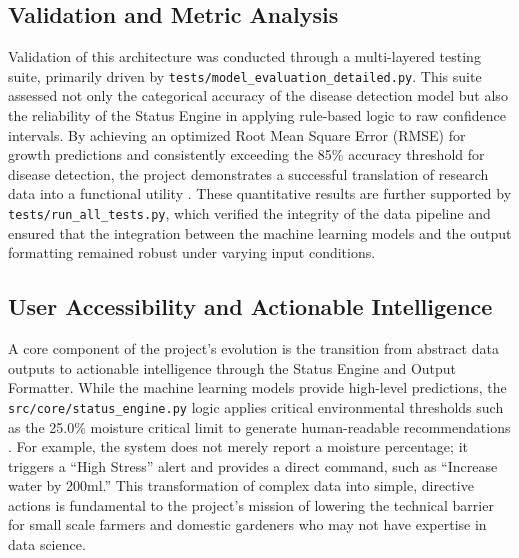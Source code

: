\documentclass[11pt,a4paper]{article}
\begin{document}
\subsection{Validation and Metric Analysis}
Validation of this architecture was conducted through a multi-layered testing suite, primarily driven by \texttt{tests/model\_evaluation\_detailed.py}. This suite assessed not only the categorical accuracy of the disease detection model but also the reliability of the Status Engine in applying rule-based logic to raw confidence intervals. By achieving an optimized Root Mean Square Error (RMSE) for growth predictions and consistently exceeding the 85\% accuracy threshold for disease detection, the project demonstrates a successful translation of research data into a functional utility \cite{av2024}. These quantitative results are further supported by \texttt{tests/run\_all\_tests.py}, which verified the integrity of the data pipeline and ensured that the integration between the machine learning models and the output formatting remained robust under varying input conditions.
	
\subsection{User Accessibility and Actionable Intelligence}
A core component of the project's evolution is the transition from abstract data outputs to actionable intelligence through the Status Engine and Output Formatter. While the machine learning models provide high-level predictions, the \texttt{src/core/status\_engine.py} logic applies critical environmental thresholds such as the 25.0\% moisture critical limit to generate human-readable recommendations \cite{umutoni2024}. For example, the system does not merely report a moisture percentage; it triggers a ``High Stress'' alert and provides a direct command, such as ``Increase water by 200ml.'' This transformation of complex data into simple, directive actions is fundamental to the project's mission of lowering the technical barrier for small scale farmers and domestic gardeners who may not have expertise in data science.
\end{document}
